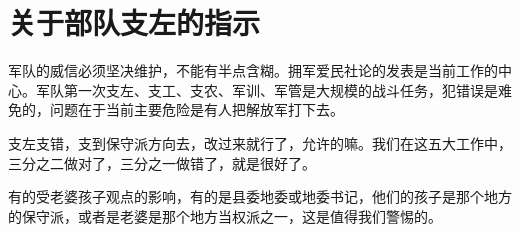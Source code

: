 \section[关于部队支左的指示（一九六七年四月）]{关于部队支左的指示}


军队的威信必须坚决维护，不能有半点含糊。拥军爱民社论的发表是当前工作的中心。军队第一次支左、支工、支农、军训、军管是大规模的战斗任务，犯错误是难免的，问题在于当前主要危险是有人把解放军打下去。


支左支错，支到保守派方向去，改过来就行了，允许的嘛。我们在这五大工作中，三分之二做对了，三分之一做错了，就是很好了。


有的受老婆孩子观点的影响，有的是县委地委或地委书记，他们的孩子是那个地方的保守派，或者是老婆是那个地方当权派之一，这是值得我们警惕的。


